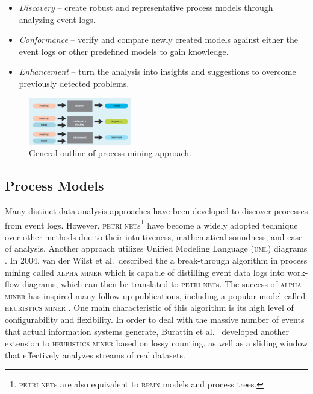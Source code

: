 \documentclass[conference]{IEEEtran}
\begin{document}
\begin{itemize}
\item \textit{Discovery} --
create robust and representative process models through
 analyzing event logs.

\item \textit{Conformance} -- verify and compare newly created
models against either the event logs or other predefined models
to gain knowledge.

\item \textit{Enhancement} -- turn the analysis 
into insights and suggestions to overcome previously
detected problems.
\end{itemize}

\begin{figure}[htbp]
\centerline{\includegraphics[width=0.4\textwidth]{images/image1.png}}
\caption{General outline of process mining approach.}
\label{fig-layout}
\end{figure}

\subsection{Process Models}

Many distinct data analysis approaches have been developed to discover
processes from event logs. However, \textsc{petri net}s\footnote{\textsc{petri net}s are also
equivalent to \textsc{bpmn} models and process trees.} have become a
widely adopted technique over other methods \cite{Cook1998} due to their
intuitiveness, mathematical soundness, and ease of analysis.
Another approach utilizes Unified
Modeling Language (\textsc{uml}) diagrams \cite{Sait2019}.
In 2004, van der Wilst et al.~described the 
a break-through algorithm in process mining
called \textsc{alpha miner}\cite{van2004} which
is capable of distilling event data logs into
work-flow diagrams, which can then be translated to \textsc{petri net}s.
The success of \textsc{alpha miner} has inspired many follow-up
publications,
including a popular model
called \textsc{heuristics miner} \cite{Weij2006}.
One main characteristic of this
algorithm is its high level of configurability and flexibility.
In order to deal with the
massive number of events that actual information systems generate,
Burattin et al.~\cite{Bura2014} developed another extension to
\textsc{heuristics miner} based on
lossy counting, as well as a sliding window that effectively analyzes
streams of real datasets.
\end{document}
